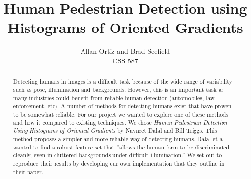 \documentclass[a4paper,11pt]{article}
\title{Human Pedestrian Detection using Histograms of Oriented Gradients}
\author{Allan Ortiz and Brad Seefield\\
	CSS 587}
\begin{document}
\maketitle
\begin{abstract}
Detecting humans in images is a difficult task because of the wide range of variability such as pose, 
illumination and backgrounds. However, this is an important task as many industries could benefit from 
reliable human detection (automobiles, law enforcement, etc). A number of methods for detecting humans 
exist that have proven to be somewhat reliable. For our project we wanted to explore one of these methods 
and how it compared to existing techniques. We chose \emph{Human Pedestrian Detection Using Histograms of 
Oriented Gradients} by Navneet Dalal and Bill Triggs\cite{dalal05}. This method proposes a simpler and more reliable 
way of detecting humans. Dalal et al wanted to find a robust feature set that “allows the human form to 
be discriminated cleanly, even in cluttered backgrounds under difficult illumination.” We set out to 
reproduce their results by developing our own implementation that they outline in their paper.
\end{abstract}
\end{document}
